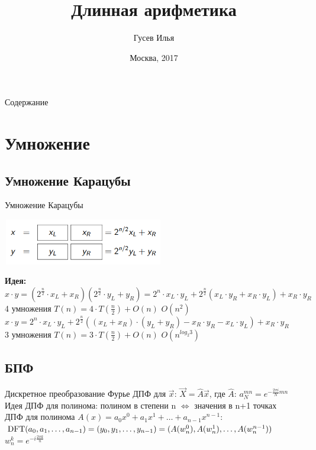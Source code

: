 \documentclass[10pt]{beamer}
\title[\href{https://goo.gl/NRgp8K}{https://goo.gl/NRgp8K} (Term 3)]{Длинная арифметика}
\author[Гусев Илья]{Гусев Илья}
\institute[МФТИ] 
{Московский физико-технический институт\\*}
\date{Москва, 2017}
\begin{document}
\begin{frame}
  \titlepage
\end{frame}

\begin{frame}{Содержание}
\tableofcontents
\end{frame}

\section{Умножение}

\subsection{Умножение Карацубы}
\begin{frame}[fragile]{Умножение Карацубы}
\begin{center}
    \includegraphics[width=7cm,height=2cm]{Term_3/Source/Pictures/karatsuba.png}\\
\end{center}
\textbf{Идея:}\\
$ x \cdot y = (2^\frac{n}{2} \cdot x_L + x_R)(2^\frac{n}{2} \cdot y_L + y_R) = 2^n \cdot x_L \cdot y_L + 2^\frac{n}{2}(x_L \cdot y_R + x_R \cdot y_L)+x_R \cdot y_R$\\
4 умножения \rightarrow $T(n) = 4 \cdot T(\frac{n}{2}) + O(n)$ \rightarrow $O(n^2)$
$ x \cdot y = 2^n \cdot x_L \cdot y_L + 2^\frac{n}{2}((x_L + x_R) \cdot (y_L + y_R) - x_R \cdot y_R - x_L \cdot y_L)+x_R \cdot y_R$\\
3 умножения \rightarrow $T(n) = 3 \cdot T(\frac{n}{2}) + O(n)$ \rightarrow $O(n^{log_2 3})$

\end{frame}

\subsection{БПФ}
\begin{frame}[fragile]{Дискретное преобразование Фурье}
ДПФ для $\vec x$: $\vec X = \hat A \vec x$, где $\hat A$:  $a_{N}^{mn} = e^ { -\frac{2\pi i}{N} mn}$\\
Идея ДПФ для полинома: полином в степени n $\Leftrightarrow$ значения в n+1 точках\\
ДПФ для полинома $A(x) = a_0 x^0 + a_1 x^1 + \ldots + a_{n-1} x^{n-1}$:  ${\rm DFT}(a_0, a_1, \ldots, a_{n-1}) = (y_0, y_1, \ldots, y_{n-1})  = (A(w_n^0), A(w_n^1), \ldots, A(w_n^{n-1}))$\\ 
$w_n^{k} = e^{ - i \frac{ 2 \pi k }{ n } }$\\
\end{frame}
\end{document}
